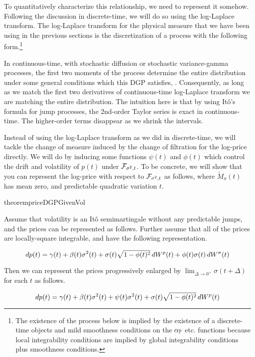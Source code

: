 \documentclass[11pt, letterpaper, twoside, final]{article}
\begin{document}
To quantitatively characterize this relationship, we need to represent it somehow.
Following the discussion in discrete-time, we will do so using the log-Laplace transform. 
The log-Laplace transform for the physical measure that we have been using in the previous sections is the
discretization of a process with the following form.\footnote{The existence of the process below is implied
    by the existence of a discrete-time objects and mild smoothness conditions on the $\alpha_{\mathbb{P}}$ etc.\@
    functions because local integrability conditions are implied by global integrability conditions plus
smoothness conditions.}

In continuous-time, with stochastic diffusion or stochastic variance-gamma processes, the first two moments of the
process determine the entire distribution under some general conditions which this DGP satisfies,
\parencite{sangrey2018jumps}.
Consequently, as long as we match the first two derivatives of continuous-time log-Laplace transform we are
matching the entire distribution.
The intuition here is that by using It\^{o}'s formula for jump  processes, the 2nd-order Taylor series is exact in
continuous-time.
The higher-order  terms disappear as we shrink the intervals. 

Instead of using the log-Laplace transform as we did in discrete-time, we will tackle the change of measure
induced by the change of filtration for the log-price directly.
We will do by inducing some functions $\psi(t)$ and $\phi(t)$ which control the drift and volatility of $p(t)$
under $\mathcal{F}_{\sigma^2,t}$.
To be concrete, we will show that you can represent the log-price with respect to $\mathcal{F}_{\sigma^2,t}$ as follows,
where $\widetilde{M}_{\sigma}(t)$ has mean zero, and predictable quadratic variation  $t$.

\begin{restatable}{theorem}{priceDGPGivenVol}
    \label{defn:logPriceGivenVol}

    Assume that volatility is an It\^{o} semimartingale without any predictable jumps, and the prices can be
    represented as follows.
    Further assume that all of the prices are locally-square integrable, and have the following representation.

    \begin{equation}
        \mathop{}\!d p(t) = \gamma(t) + \beta(t) \sigma^2(t) + \sigma(t) \sqrt{1 - \phi(t)^2} \mathop{}\!d W^p(t) + \phi(t)
        \sigma(t) \mathop{}\!d W^{\sigma}(t) 
    \end{equation}

    Then we can represent the prices progressively enlarged by $\lim_{\Delta \to 0^{+}} \sigma(t + \Delta)$ for
    each $t$ as follows.

    \begin{equation}
        \label{eqn:eqn:price_process_decomp}
        \mathop{}\!d p(t) = \gamma(t) + \beta(t) \sigma^2(t) + \psi(t) \sigma^2(t) + \sigma(t) \sqrt{1 - \phi(t)^2} \mathop{}\!d
        W^p(t) 
    \end{equation}

\end{restatable}
\end{document}
